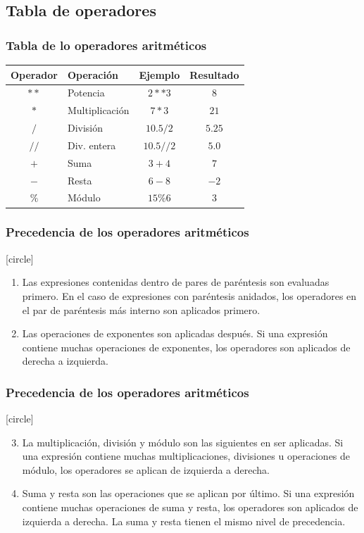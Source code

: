 {\subsection{Tabla de operadores}
\begin{frame}
\frametitle{Tabla de lo operadores aritméticos}
\begin{table}
\fontsize{12}{12}\selectfont
\begin{tabular}{|c | l | c | c|}
\hline
Operador & Operación & Ejemplo & Resultado \\ \hline
$**$ & Potencia & $2**3$ & $8$ \\ \hline
$*$ & Multiplicación & $7*3$ & $21$ \\ \hline
$/$ & División & $10.5/2$ & $5.25$ \\ \hline
$ //$ & Div. entera & $10.5//2 $ & $5.0$ \\ \hline
$+$ & Suma & $3+4$ & $7$ \\ \hline
$-$ & Resta & $6-8$ & $-2$ \\ \hline
$\%$ & Módulo & $15\%6$ & $3$ \\ \hline
\end{tabular}
\end{table}
\end{frame}
\begin{frame}
\frametitle{Precedencia de los operadores aritméticos}
[circle]
\begin{enumerate}[<+->]
\item Las expresiones contenidas dentro de pares de paréntesis son evaluadas primero. En el caso de expresiones con paréntesis anidados, los operadores en el par de paréntesis más interno son aplicados primero.
\item Las operaciones de exponentes son aplicadas después. Si una expresión contiene muchas operaciones de exponentes, los operadores son aplicados de derecha a izquierda.
\end{enumerate}
\end{frame}
\begin{frame}
\frametitle{Precedencia de los operadores aritméticos}
[circle]
\begin{enumerate}[<+->]
\setcounter{enumi}{2}
\item La multiplicación, división y módulo son las siguientes en ser aplicadas. Si una expresión contiene muchas multiplicaciones, divisiones u operaciones de módulo, los operadores se aplican de izquierda a derecha.
\item Suma y resta son las operaciones que se aplican por último. Si una expresión contiene muchas operaciones de suma y resta, los operadores son aplicados de izquierda a derecha. La suma y resta tienen el mismo nivel de precedencia.
\end{enumerate}
\end{frame}
}
